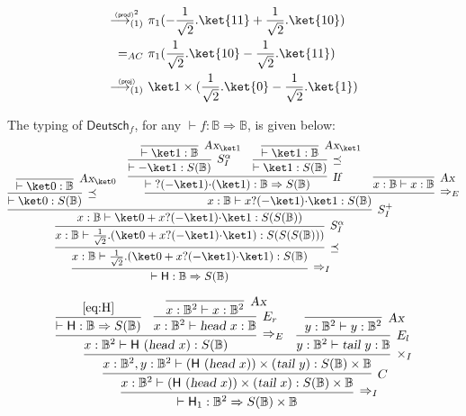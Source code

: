 \documentclass[preprint]{elsarticle}
\newcommand\lra[1][1]{\longrightarrow_{\left(#1\right)}}
\newcommand\B{\ensuremath{\mathbb B}}
\newcommand\ite[3]{{#1}?{#2}\mathord{\cdot}{#3}}
\newcommand\pair[2]{({#1}+{#2})}
\newcommand\npair[2]{({#1}-{#2})}
\newcommand\s[1]{\ensuremath{\mathsf{#1}}}
\newcommand\head{\text{\sl head}}
\newcommand\tail{\text{\sl tail}}
\newcommand\red[2][1]{\overset{\scriptscriptstyle\smash{#2}\vphantom{x}}{\lra[#1]}\ }
\newcommand\rprod{(\s{prod})}
\newcommand\rproj{(\s{proj})}
\newcommand\tax{\textsl{Ax}}
\newcommand\tif{\textsl{If}}
\begin{document}
\begin{align*}
  \red{\rprod^2} &
                   \pi_1
                   \pair
                   {
                   {-\frac 1{\sqrt 2}}.\ket{11}
                   }
                   {
                   \frac 1{\sqrt 2}.\ket{10}
                   }
  \\
  =_{AC}\ &
            \pi_1
            \npair
            {
            \frac 1{\sqrt 2}.\ket{10}
            }
            {
            \frac 1{\sqrt 2}.\ket{11}
            }
  \\
  \red\rproj &
               \ket 1\times\npair
               {
               \frac 1{\sqrt 2}.\ket{0}
               }
               {
               \frac 1{\sqrt 2}.\ket{1}
               }
\end{align*}


The typing of $\s{Deutsch}_f$, for any $\vdash f:\B\Rightarrow\B$, is given
below:
\begin{equation}
  \label{eq:H}
  \infer[\Rightarrow_I]
  {\vdash\s H:\B\Rightarrow S(\B)}
  {
    \infer[\preceq]
    {x:\B\vdash\frac 1{\sqrt 2}.(\ket 0+\ite{x}{(-\ket 1)}{\ket 1}):S(\B)}
    {
      \infer[S_I^\alpha]
      {x:\B\vdash\frac 1{\sqrt 2}.(\ket 0+\ite{x}{(-\ket 1)}{\ket 1}):S(S(S(\B)))}
      {
        \infer[S_I^+]
        {x:\B\vdash\ket 0+\ite{x}{(-\ket 1)}{\ket 1}:S(S(\B))}
        {
          \infer[\preceq]
          {\vdash\ket 0:S(\B)}
          {\infer[\tax_{\ket 0}]{\vdash\ket 0:\B}{}}
          &
          \infer[\Rightarrow_{E}]
          {x:\B\vdash\ite x{(-\ket 1)}{\ket 1}:S(\B)}
          {
            \infer[\tif]{\vdash\ite{}{(-\ket 1)}{(\ket 1)}:\B\Rightarrow S(\B)}
            {
              \infer[S_I^\alpha]{\vdash -\ket 1:S(\B)}
              {
                \infer[\tax_{\ket 1}]{\vdash\ket 1:\B}{}
              }
              &
              \infer[\preceq]{\vdash\ket 1:S(\B)}
              {
                \infer[\tax_{\ket 1}]{\vdash\ket 1:\B}{}
              }
            }
            &
            \infer[\tax]{x:\B\vdash x:\B}{}
          }
        }
      }
    }
  }
\end{equation}

\begin{equation}
  \label{eq:Hone}
  \infer[\Rightarrow_I]
  {\vdash \s H_1:\B^2\Rightarrow S(\B)\times\B}
  {
    \infer[C]
    {x:\B^2\vdash (\s H\ (\head\ x))\times(\tail\ x):S(\B)\times\B}
    {
      \infer[\times_I]
      {x:\B^2,y:\B^2\vdash (\s H\ (\head\ x))\times(\tail\ y):S(\B)\times\B}
      {
        \infer[\Rightarrow_E]
        {x:\B^2\vdash \s H\ (\head\ x):S(\B)}
        {
          \infer{\vdash \s H:\B\Rightarrow S(\B)}{\eqref{eq:H}}
          &
          \infer[E_r]
          {x:\B^2\vdash\head\ x:\B}
          {
            \infer[\tax]{x:\B^2\vdash x:\B^2}{}
          }
        }
        &
        \infer[E_l]
        {y:\B^2\vdash\tail\ y:\B}
        {
          \infer[\tax]{y:\B^2\vdash y:\B^2}{}
        }
      }
    }
  }
\end{equation}
\end{document}

